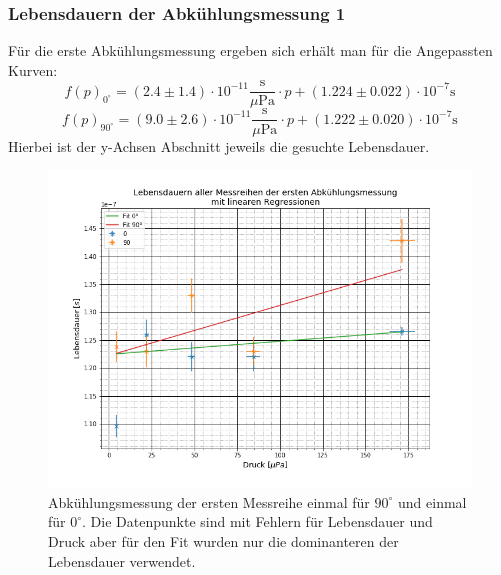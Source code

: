\subsubsection{Lebensdauern der Abkühlungsmessung 1}
Für die erste Abkühlungsmessung ergeben sich erhält man für die Angepassten Kurven:
\begin{equation*}
	f(p)_{0^\circ}=(2.4 \pm 1.4)\cdot 10^{-11} \frac{\text{s}}{\text{$\mu$Pa}}\cdot p + (1.224\pm 0.022)\cdot 10^{-7} \text{s}
\end{equation*}
\begin{equation*}
	f(p)_{90^\circ}=(9.0\pm 2.6)\cdot 10^{-11} \frac{\text{s}}{\text{$\mu$Pa}}\cdot p + (1.222\pm 0.020)\cdot 10^{-7} \text{s}
\end{equation*}
Hierbei ist der y-Achsen Abschnitt jeweils die gesuchte Lebensdauer.
\begin{figure}[ht]
	\includegraphics[scale=0.5]{Bild/Abk1}
	\centering
	\caption[Druck zu Lebensdauer Fit für Abkühlung 1]{Abkühlungsmessung der ersten Messreihe einmal für $90^\circ$ und einmal für $0^\circ$. Die Datenpunkte sind mit Fehlern für Lebensdauer und Druck aber für den Fit wurden nur die dominanteren der Lebensdauer verwendet.}
	\label{Abk1}
\end{figure}
\FloatBarrier
